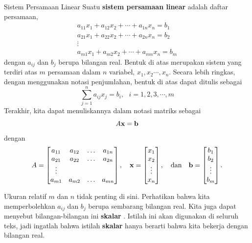 \begin{definition}{Sistem Persamaan Linear}\label{def:systemoflinearequations}
Suatu \textbf{sistem persamaan linear}  adalah daftar persamaan,
\begin{equation*}
\begin{array}{c}
a_{11}x_{1}+a_{12}x_{2}+\cdots +a_{1n}x_{n}=b_{1} \\
a_{21}x_{1}+a_{22}x_{2}+\cdots +a_{2n}x_{n}=b_{2} \\
\vdots \\
a_{m1}x_{1}+a_{m2}x_{2}+\cdots +a_{mn}x_{n}=b_{m}
\end{array}
\end{equation*}
dengan $a_{ij}$ dan $b_{j}$ berupa bilangan real. Bentuk di atas merupakan sistem
yang terdiri atas $m$ persamaan dalam $n$ variabel, $x_{1},x_{2}\cdots ,x_{n}$.
 Secara lebih ringkas, dengan menggunakan
notasi penjumlahan, bentuk di atas dapat ditulis sebagai
\begin{equation*}
\sum_{j=1}^{n}a_{ij}x_{j}=b_{i},
\text{ }i=1,2,3,\cdots ,m
\end{equation*}
Terakhir, kita dapat menuliskannya dalam notasi matriks sebagai
$$
A \mathbf{x} = \mathbf{b} 
$$
dengan
$$
A = \begin{bmatrix}
a_{11} & a_{12} & \dots & a_{1n}\\
a_{21} & a_{22} & \dots & a_{2n}\\
\vdots\\
a_{m1} & a_{m2} & \dots & a_{mn}
\end{bmatrix}, \ \ \ \mathbf{x} = \begin{bmatrix} x_1 \\ x_2 \\ \vdots \\ x_n\end{bmatrix}, \ \ \mbox{ dan } \ \ \mathbf{b} = \begin{bmatrix} b_1 \\ b_2 \\ \vdots \\ b_m\end{bmatrix}.
$$
\end{definition}

Ukuran relatif $m$ dan $n$ tidak penting di sini. Perhatikan bahwa kita
memperbolehkan $a_{ij}$ dan $b_{j}$ berupa sembarang bilangan real. Kita juga dapat
menyebut bilangan-bilangan ini \textbf{skalar} . Istilah ini akan digunakan
di seluruh teks, jadi ingatlah bahwa istilah
\textbf{skalar} hanya berarti bahwa kita bekerja dengan bilangan real.


